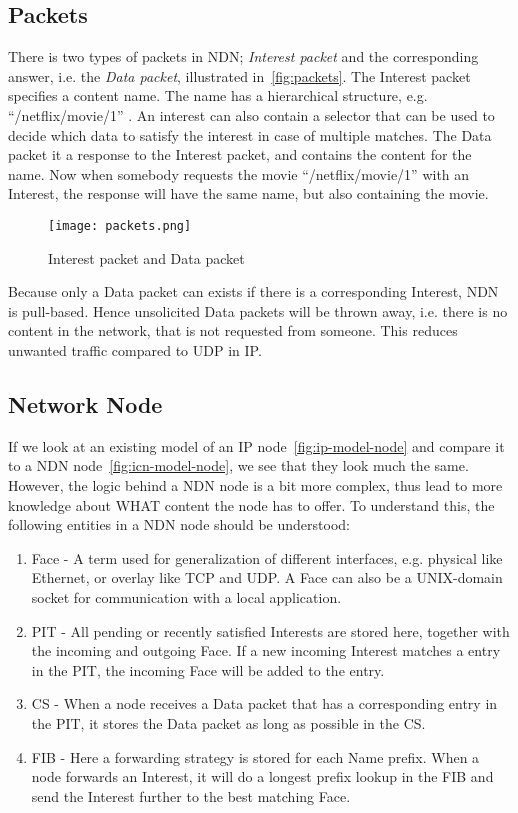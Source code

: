 \subsection{Packets}
There is two types of packets in \gls{NDN};
\textit{Interest packet} and the corresponding answer, i.e. the \textit{Data packet}, illustrated in~\autoref{fig:packets}.
The Interest packet specifies a content name. 
The name has a hierarchical structure, e.g. ``/netflix/movie/1'' .  
An interest can also contain a selector that can be used to decide which data to satisfy the interest in case of multiple matches.
The Data packet it a response to the Interest packet, and contains the content for the name.
Now when somebody requests the movie ``/netflix/movie/1'' with an Interest, the response will have the same name, but also containing the movie. 

\begin{figure}[H]
  \centering
  \texttt{[image: packets.png]}
  \caption{Interest packet and Data packet}
  \label{fig:packets}
\end{figure}

Because only a Data packet can exists if there is a corresponding Interest, \gls{NDN} is pull-based.
Hence unsolicited Data packets will be thrown away, i.e. there is no content in the network, that is not requested from someone.
This reduces unwanted traffic compared to \gls{UDP} in \gls{IP}.

\subsection{Network Node}
If we look at an existing model of an \gls{IP} node~\autoref{fig:ip-model-node} and compare it to a \gls{NDN} node~\autoref{fig:icn-model-node}, we see that they look much the same.
However, the logic behind a \gls{NDN} node is a bit more complex, thus lead to more knowledge about WHAT content the node has to offer.
To understand this, the following entities in a \gls{NDN} node should be understood:
\begin{enumerate}
  \item Face - A term used for generalization of different interfaces, e.g. physical like Ethernet, or overlay like \gls{TCP} and \gls{UDP}. A Face can also be a UNIX-domain socket for communication with a local application.
  \item \gls{PIT} - All pending or recently satisfied Interests are stored here, together with the incoming and outgoing Face.
  If a new incoming Interest matches a entry in the \gls{PIT}, the incoming Face will be added to the entry. 
  \item \gls{CS} - When a node receives a Data packet that has a corresponding entry in the \gls{PIT}, it stores the Data packet as long as possible in the \gls{CS}. 
  \item \gls{FIB} - Here a forwarding strategy is stored for each Name prefix. 
  When a node forwards an Interest, it will do a longest prefix lookup in the \gls{FIB} and send the Interest further to the best matching Face.
\end{enumerate}

